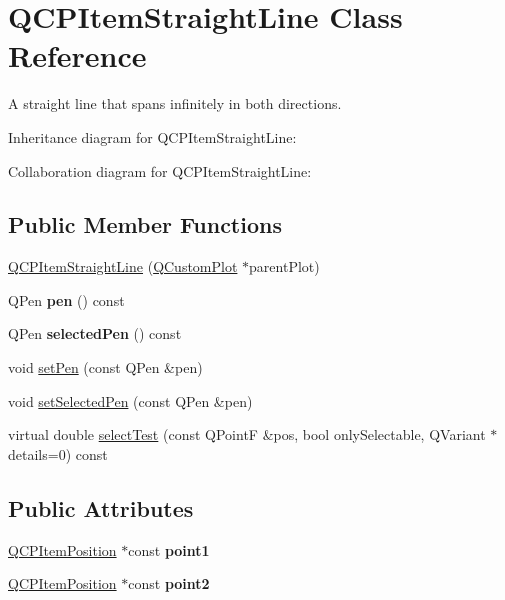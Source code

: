 \hypertarget{classQCPItemStraightLine}{}\section{Q\+C\+P\+Item\+Straight\+Line Class Reference}
\label{classQCPItemStraightLine}


A straight line that spans infinitely in both directions.  




Inheritance diagram for Q\+C\+P\+Item\+Straight\+Line\+:


Collaboration diagram for Q\+C\+P\+Item\+Straight\+Line\+:
\subsection*{Public Member Functions}
\begin{DoxyCompactItemize}
\item 
\hyperlink{classQCPItemStraightLine_a41fd2e1f006983449eca9830930c3b10}{Q\+C\+P\+Item\+Straight\+Line} (\hyperlink{classQCustomPlot}{Q\+Custom\+Plot} $\ast$parent\+Plot)
\item 
Q\+Pen {\bfseries pen} () const \hypertarget{classQCPItemStraightLine_ad858ab1a444391aab778f765453ea222}{}\label{classQCPItemStraightLine_ad858ab1a444391aab778f765453ea222}

\item 
Q\+Pen {\bfseries selected\+Pen} () const \hypertarget{classQCPItemStraightLine_a9e33ae966a7e2ea1083b3b9aeabeaea5}{}\label{classQCPItemStraightLine_a9e33ae966a7e2ea1083b3b9aeabeaea5}

\item 
void \hyperlink{classQCPItemStraightLine_a9f36c9c9e60d7d9ac084c80380ac8601}{set\+Pen} (const Q\+Pen \&pen)
\item 
void \hyperlink{classQCPItemStraightLine_a5c33559498d33543fa95cf0a36e851ff}{set\+Selected\+Pen} (const Q\+Pen \&pen)
\item 
virtual double \hyperlink{classQCPItemStraightLine_a64cc3796f58ce856012732603edb2f1c}{select\+Test} (const Q\+PointF \&pos, bool only\+Selectable, Q\+Variant $\ast$details=0) const 
\end{DoxyCompactItemize}
\subsection*{Public Attributes}
\begin{DoxyCompactItemize}
\item 
\hyperlink{classQCPItemPosition}{Q\+C\+P\+Item\+Position} $\ast$const {\bfseries point1}\hypertarget{classQCPItemStraightLine_ac131a6ffe456f2cc7364dce541fe0120}{}\label{classQCPItemStraightLine_ac131a6ffe456f2cc7364dce541fe0120}

\item 
\hyperlink{classQCPItemPosition}{Q\+C\+P\+Item\+Position} $\ast$const {\bfseries point2}\hypertarget{classQCPItemStraightLine_ad26c0a732e471f63f75d481dcd48cfc9}{}\label{classQCPItemStraightLine_ad26c0a732e471f63f75d481dcd48cfc9}

\end{DoxyCompactItemize}

